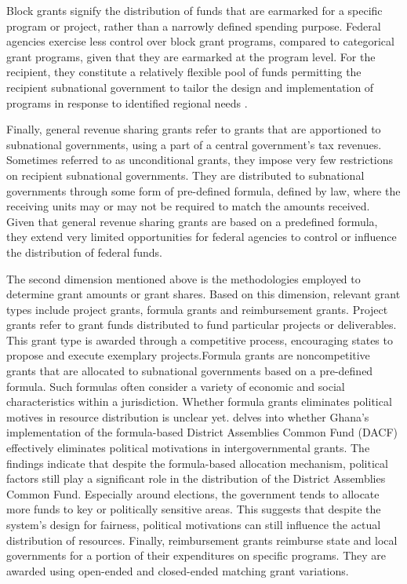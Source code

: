 Block grants signify the distribution of funds that are earmarked for a specific program or project, rather than a narrowly defined spending purpose. Federal agencies exercise less control over block grant programs, compared to categorical grant programs, given that they are earmarked at the program level. For the recipient, they constitute a relatively flexible pool of funds permitting the recipient subnational government to tailor the design and implementation of programs in response to identified regional needs \parencite{finegold2004block}.

Finally, general revenue sharing grants refer to grants that are apportioned to subnational governments, using a part of a central government's tax revenues. Sometimes referred to as unconditional grants, they impose very few restrictions on recipient subnational governments. They are distributed to subnational governments through some form of pre-defined formula, defined by law, where the receiving units may or may not be required to match the amounts received\parencite{larkey2015evaluating}. Given that general revenue sharing grants are based on a predefined formula, they extend very limited opportunities for federal agencies to control or influence the distribution of federal funds.


The second dimension mentioned above is the methodologies employed to determine grant amounts or grant shares. Based on this dimension, relevant grant types include project grants, formula grants and reimbursement grants. Project grants refer to grant funds distributed to fund particular projects or deliverables. This grant type is awarded through a competitive process, encouraging states to
propose and execute exemplary projects\parencite{dilger2015federal}.Formula grants are noncompetitive grants that are allocated to subnational governments based on a pre-defined formula. Such formulas often consider a variety of economic and social characteristics within a jurisdiction\parencite{huffman2006formula}. Whether formula grants eliminates political motives in resource distribution is unclear yet. \textcite{banful2011formula} delves into whether Ghana's implementation of the formula-based District Assemblies Common Fund (DACF) effectively eliminates political motivations in intergovernmental grants. The findings indicate that despite the formula-based allocation mechanism, political factors still play a significant role in the distribution of the District Assemblies Common Fund. Especially around elections, the government tends to allocate more funds to key or politically sensitive areas. This suggests that despite the system's design for fairness, political motivations can still influence the actual distribution of resources.   Finally, reimbursement grants reimburse state and local governments for a portion of their expenditures on specific programs. They are awarded using open-ended and closed-ended matching grant variations.


